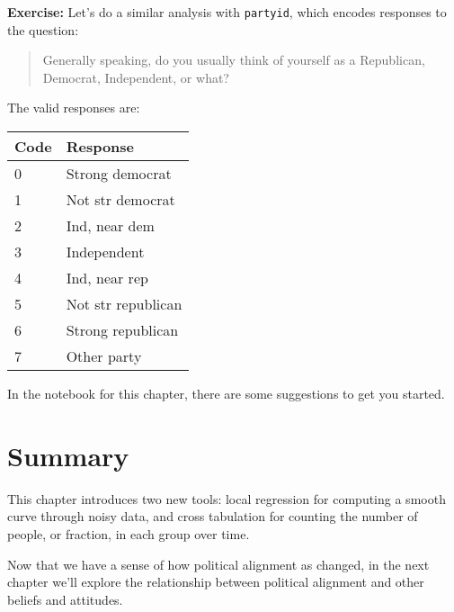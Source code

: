 \textbf{Exercise:} Let's do a similar analysis with
\passthrough{\lstinline!partyid!}, which encodes responses to the
question:

\begin{quote}
Generally speaking, do you usually think of yourself as a Republican,
Democrat, Independent, or what?
\end{quote}

The valid responses are:

\begin{longtable}[]{@{}ll@{}}
\midrule()
Code & Response \\
\midrule()
\endhead
0 & Strong democrat \\
1 & Not str democrat \\
2 & Ind, near dem \\
3 & Independent \\
4 & Ind, near rep \\
5 & Not str republican \\
6 & Strong republican \\
7 & Other party \\
\midrule()
\end{longtable}

In the notebook for this chapter, there are some suggestions to get you
started.

\hypertarget{summary}{%
\section{Summary}\label{summary}}

This chapter introduces two new tools: local regression for computing a
smooth curve through noisy data, and cross tabulation for counting the
number of people, or fraction, in each group over time.

Now that we have a sense of how political alignment as changed, in the
next chapter we'll explore the relationship between political alignment
and other beliefs and attitudes.


